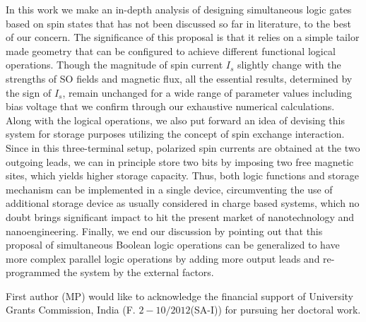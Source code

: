 \documentclass[doublecol]{epl2}
\begin{document}
In this work we make an in-depth analysis of designing simultaneous logic
gates based on spin states that has not been discussed so far in literature,
to the best of our concern. The significance of this proposal is that it
relies on a simple tailor made geometry that can be configured to achieve 
different functional logical operations. Though the magnitude of spin 
current $I_s$ slightly change with the strengths of SO fields and magnetic 
flux, all the essential results, determined by the sign of $I_s$, remain 
unchanged for a wide range of parameter values including bias voltage 
that we confirm through our exhaustive numerical calculations. Along 
with the logical operations, we also put forward an idea of devising 
this system for storage purposes utilizing the concept of spin exchange 
interaction. Since in this three-terminal setup, polarized spin currents 
are obtained at the two outgoing leads, we can in principle store two 
bits by imposing two free magnetic sites, which yields higher storage 
capacity. Thus, both logic functions and storage mechanism can be 
implemented in a single device, circumventing the use of additional storage
device as usually considered in charge based systems, which no doubt brings 
significant impact to hit the present market of nanotechnology and 
nanoengineering. Finally, we end our discussion by pointing out that this 
proposal of simultaneous Boolean logic operations can be generalized to have
more complex parallel logic operations by adding more output leads and 
re-programmed the system by the external factors.

\acknowledgments

First author (MP) would like to acknowledge the financial support of University 
Grants Commission, India (F. $2-10/2012$(SA-I)) for pursuing her doctoral work.
\end{document}
